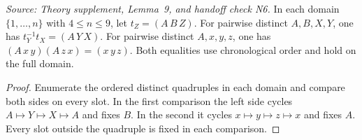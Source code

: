 \begin{lemma}
  \label{lem:n6-cycle-identities}
  \leanok
  \textit{Source: Theory supplement, Lemma~9, and handoff check N6.}
  In each domain \(\{1,\ldots,n\}\) with \(4\le n\le9\), let
  \(t_Z=(A\,B\,Z)\). For pairwise distinct \(A,B,X,Y\), one has
  \(t_Y^{-1}t_X=(A\,Y\,X)\). For pairwise distinct \(A,x,y,z\), one has
  \((A\,x\,y)(A\,z\,x)=(x\,y\,z)\). Both equalities use chronological
  order and hold on the full domain.
\end{lemma}
\begin{proof}
  \leanok
  Enumerate the ordered distinct quadruples in each domain and compare
  both sides on every slot. In the first comparison the left side
  cycles \(A\mapsto Y\mapsto X\mapsto A\) and fixes \(B\). In the
  second it cycles \(x\mapsto y\mapsto z\mapsto x\) and fixes \(A\).
  Every slot outside the quadruple is fixed in each comparison.
\end{proof}
